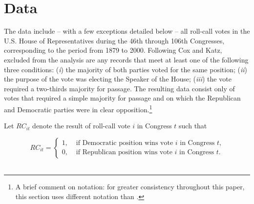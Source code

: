 \section{Data}
\label{ckdata}

The data include -- with a few exceptions detailed below -- all roll-call votes in the 
U.S. House of Representatives during the 46th through 106th Congresses, corresponding 
to the period from 1879 to 2000.  Following Cox and Katz, excluded from the analysis are 
any records that meet at least one of the following three conditions: ({\it i}) the majority of 
both parties voted for the same position; ({\it ii}) the purpose of the vote was electing the 
Speaker of the House; ({\it iii}) the vote required a two-thirds majority for passage.
The resulting data consist only of votes that required a simple majority for passage and on 
which the Republican and Democratic parties were in clear opposition.\footnote{A brief 
comment on notation: for greater consistency throughout this paper, this section uses different 
notation than .}

Let $RC_{it}$ denote the result of roll-call vote $i$ in Congress $t$ such that 

\begin{equation*}
RC_{it} =
\begin{cases} 
1, & \text{ if Democratic position wins vote $i$ in Congress $t$,} \\[10pt]
0, & \text{ if Republican position wins vote $i$ in Congress $t$.}
\end{cases}
\end{equation*}
~\\[-12pt]


